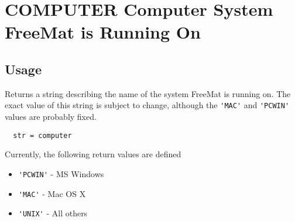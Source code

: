 \section{COMPUTER Computer System FreeMat is Running On}

\subsection{Usage}

Returns a string describing the name of the system FreeMat is running on.
The exact value of this string is subject to change, although the \verb|'MAC'|
and \verb|'PCWIN'| values are probably fixed.
\begin{verbatim}
  str = computer
\end{verbatim}
Currently, the following return values are defined
\begin{itemize}
\item  \verb|'PCWIN'| - MS Windows

\item  \verb|'MAC'| - Mac OS X

\item  \verb|'UNIX'| - All others

\end{itemize}
